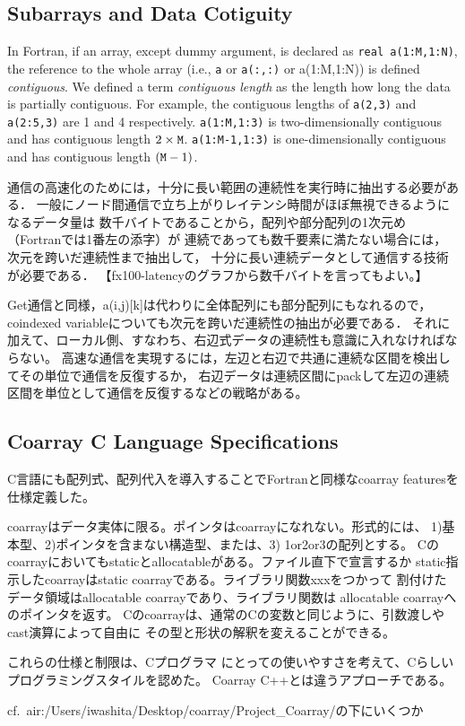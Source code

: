\subsection{Subarrays and Data Cotiguity}

In Fortran, if an array, except dummy argument, is declared as {\tt real a(1:M,1:N)}, 
the reference to the whole array (i.e., {\tt a} or {\tt a(:,:)} or {a(1:M,1:N)})
is defined {\em contiguous}. 
We defined a term {\em contiguous length} as the length how long the data is partially
contiguous. For example, the contiguous lengths of {\tt a(2,3)} and {\tt a(2:5,3)} are
1 and 4 respectively.  {\tt a(1:M,1:3)} is two-dimensionally contiguous and has 
contiguous length $2 \times {\tt M}$.
{\tt a(1:M-1,1:3)} is one-dimensionally contiguous and has 
contiguous length $({\tt M} - 1)$.


\requirement
通信の高速化のためには，十分に長い範囲の連続性を実行時に抽出する必要がある．
一般にノード間通信で立ち上がりレイテンシ時間がほぼ無視できるようになるデータ量は
数千バイトであることから，配列や部分配列の1次元め（Fortranでは1番左の添字）が
連続であっても数千要素に満たない場合には，次元を跨いだ連続性まで抽出して，
十分に長い連続データとして通信する技術が必要である．
【fx100-latencyのグラフから数千バイトを言ってもよい。】

Get通信と同様，a(i,j)[k]は代わりに全体配列にも部分配列にもなれるので，
coindexed variableについても次元を跨いだ連続性の抽出が必要である．
それに加えて、ローカル側、すなわち、右辺式データの連続性も意識に入れなければならない。
高速な通信を実現するには，左辺と右辺で共通に連続な区間を検出してその単位で通信を反復するか，
右辺データは連続区間にpackして左辺の連続区間を単位として通信を反復するなどの戦略がある。



\subsection{Coarray C Language Specifications}

C言語にも配列式、配列代入を導入することでFortranと同様なcoarray featuresを仕様定義した。

coarrayはデータ実体に限る。ポインタはcoarrayになれない。形式的には、
1)基本型、2)ポインタを含まない構造型、または、3) 1or2or3の配列とする。
Cのcoarrayにおいてもstaticとallocatableがある。ファイル直下で宣言するか
static指示したcoarrayはstatic coarrayである。ライブラリ関数xxxをつかって
割付けたデータ領域はallocatable coarrayであり、ライブラリ関数は
allocatable coarrayへのポインタを返す。
Cのcoarrayは、通常のCの変数と同じように、引数渡しやcast演算によって自由に
その型と形状の解釈を変えることができる。

これらの仕様と制限は、Cプログラマ
にとっての使いやすさを考えて、Cらしいプログラミングスタイルを認めた。
Coarray C++とは違うアプローチである。

cf.\ air:/Users/iwashita/Desktop/coarray/Project\_Coarray/の下にいくつか
